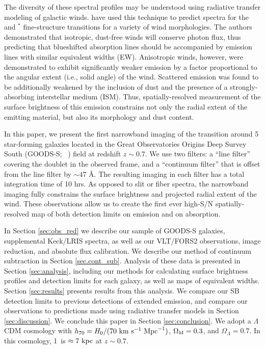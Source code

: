 \documentclass[trackchanges,twocolumn]{aastex62}
\newcommand{\citethnop}[1]{\citeauthor{#1}\ \citeyear{#1}}
\begin{document}
The diversity of these spectral profiles may be understood using radiative transfer modeling of galactic winds. \citet{Prochaska_2011} have used this technique to predict 
spectra for the   and  $^*$ fine-structure transitions for a variety of wind morphologies. The authors demonstrated that isotropic, dust-free winds will conserve photon flux, thus predicting that blueshifted absorption lines should be accompanied by emission lines with similar equivalent widths (EW). Anisotropic winds, however, were demonstrated to exhibit significantly weaker emission by a factor proportional to the angular extent (i.e., solid angle) of the wind. Scattered emission was found to be additionally weakened by the inclusion of dust and the presence of a strongly-absorbing interstellar medium (ISM). Thus, spatially-resolved measurement of the surface brightness of this emission constrains not only the radial extent of the emitting material, but also its morphology and dust content.

In this paper, we present the first narrowband imaging of the  transition around 5 star-forming  galaxies located in the Great Observatories Origins Deep Survey South (GOODS-S; \citethnop{Giavalisco2004})  field at redshift $z \sim 0.7$. 
We use two filters: a  ``line filter'' covering the  doublet in the observed frame, and a ``continuum filter'' that is offset from the line filter by ${\sim}47$ \AA.    
The resulting imaging in each filter has a total integration time of 10 hrs. As opposed to slit or fiber spectra, the narrowband imaging fully constrains the surface brightness and projected radial extent of the wind. These observations allow us to create the first ever high-S/N spatially-resolved map of both detection limits on  emission and on  absorption. 

In Section \ref{sec:obs_red} we describe our sample of GOODS-S galaxies, supplemental Keck/LRIS spectra, as well as our VLT/FORS2 observations, image reduction, and absolute flux calibration. We describe our method of continuum subtraction in Section \ref{sec.cont_sub}. Analysis of these data is presented in Section \ref{sec:analysis}, 
including our methods for calculating surface brightness profiles and detection limits for each galaxy, as well as maps of  equivalent widths.
Section \ref{sec:results} presents results from this analysis. We compare our SB detection limits to previous detections of extended  emission,  and compare our observations to predictions made using radiative transfer models in Section \ref{sec:discussion}. We conclude this paper in Section \ref{sec:conclusion}.
We adopt a $\Lambda$CDM cosmology with $h_{70} = H_0/(70\ \rm{ km}\ \rm{ s}^{-1}\ \rm{ Mpc}^{-1})$, $\Omega_{\rm{M}}= 0.3$, and $\Omega_{\Lambda} = 0.7$. In this cosmology, 1\arcsec\  is $\approx 7\ \rm kpc$ at $z \sim 0.7$.
\end{document}
